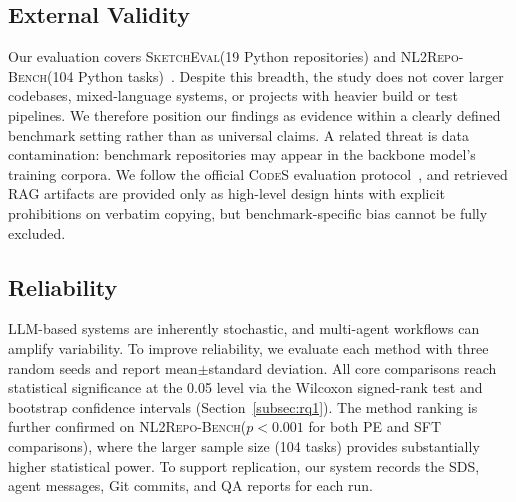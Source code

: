 \documentclass[format=acmsmall, review=false, screen=true]{acmart}
\newcommand{\codes}{\textsc{CodeS}\xspace}
\newcommand{\sketcheval}{\textsc{SketchEval}\xspace}
\newcommand{\nlrepobench}{\textsc{NL2Repo-Bench}\xspace}
\begin{document}
\subsection{External Validity}\label{subsec:threats-external}
Our evaluation covers \sketcheval (19 Python repositories) and \nlrepobench (104 Python tasks)~\cite{Zan2025CodeS,Ding2025NL2RepoBench}.
Despite this breadth, the study does not cover larger codebases, mixed-language systems, or projects with heavier build or test pipelines.
We therefore position our findings as evidence within a clearly defined benchmark setting rather than as universal claims.
A related threat is data contamination: benchmark repositories may appear in the backbone model's training corpora.
We follow the official \codes evaluation protocol~\cite{Zan2025CodeS}, and retrieved RAG artifacts are provided only as high-level design hints with explicit prohibitions on verbatim copying, but benchmark-specific bias cannot be fully excluded.

\subsection{Reliability}\label{subsec:threats-reliability}
LLM-based systems are inherently stochastic, and multi-agent workflows can amplify variability.
To improve reliability, we evaluate each method with three random seeds and report mean$\pm$standard deviation.
All core comparisons reach statistical significance at the 0.05 level via the Wilcoxon signed-rank test and bootstrap confidence intervals (Section~\ref{subsec:rq1}).
The method ranking is further confirmed on \nlrepobench ($p < 0.001$ for both PE and SFT comparisons), where the larger sample size (104 tasks) provides substantially higher statistical power.
To support replication, our system records the SDS, agent messages, Git commits, and QA reports for each run.
\end{document}
